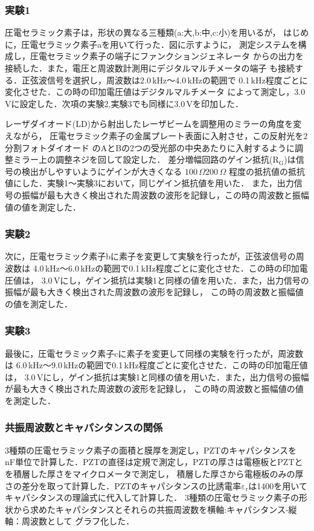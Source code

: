 \documentclass{ltjsarticle}
\begin{document}
		\subsubsection{実験1}
			圧電セラミック素子は，形状の異なる三種類(a:大,b:中,c:小)を用いるが，
			はじめに，圧電セラミック素子aを用いて行った．図に示すように，
			測定システムを構成し，圧電セラミック素子の端子にファンクションジェネレータ
			からの出力を接続した．また，電圧と周波数計測用にデジタルマルチメータの端子
			も接続する．正弦波信号を選択し，周波数は2.0\,kHz～4.0\,kHzの範囲で
			0.1\,kHz程度ごとに変化させた．この時の印加電圧値はデジタルマルチメータ
			によって測定し，3.0\,Vに設定した．次項の実験2,実験3でも同様に3.0\,Vを印加した．

			レーザダイオード(LD)から射出したレーザビームを調整用のミラーの角度を変えながら，
			圧電セラミック素子の金属プレート表面に入射させ，この反射光を2分割フォトダイオード
			のAとBの2つの受光部の中央あたりに入射するように調整ミラー上の調整ネジを回して設定した．
			差分増幅回路のゲイン抵抗($\mathrm{R_G}$)は信号の検出がしやすいようにゲインが大きくなる
			$100\,\Omega 200\,\Omega$ 程度の抵抗値の抵抗値にした．実験1～実験3において，同じゲイン抵抗値を用いた．
			また，出力信号の振幅が最も大きく検出された周波数の波形を記録し，この時の周波数と振幅値の値を測定した．

		\subsubsection{実験2}
			次に，圧電セラミック素子bに素子を変更して実験を行ったが，正弦波信号の周波数は
			4.0\,kHz～6.0\,kHzの範囲で0.1\,kHz程度ごとに変化させた．この時の印加電圧値は，
			3.0\,Vにし，ゲイン抵抗は実験1と同様の値を用いた．また，出力信号の振幅が最も大きく検出された周波数の波形を記録し，
			この時の周波数と振幅値の値を測定した．

		\subsubsection{実験3}
			最後に，圧電セラミック素子cに素子を変更して同様の実験を行ったが，周波数は
			6.0\,kHz～9.0\,kHzの範囲で0.1\,kHz程度ごとに変化させた．この時の印加電圧値は，
			3.0\,Vにし，ゲイン抵抗は実験1と同様の値を用いた．また，出力信号の振幅が最も大きく検出された周波数の波形を記録し，
			この時の周波数と振幅値の値を測定した．

		\subsubsection{共振周波数とキャパシタンスの関係}
			3種類の圧電セラミック素子の面積と膜厚を測定し，PZTのキャパシタンスを
			nF単位で計算した．PZTの直径は定規で測定し，PZTの厚さは電極板とPZTとを積層した厚さをマイクロメータで測定し，
			積層した厚さから電極板のみの厚さの差分を取って計算した．PZTのキャパシタンスの比誘電率$\mathrm{ε_r}$は1400を用いて
			キャパシタンスの理論式に代入して計算した．
			3種類の圧電セラミック素子の形状から求めたキャパシタンスとそれらの共振周波数を横軸:キャパシタンス-縦軸：周波数として
			グラフ化した．
\end{document}

